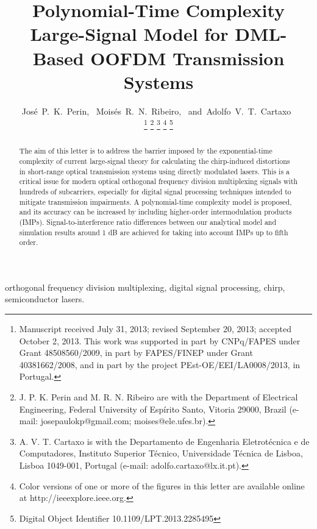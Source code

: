 \documentclass[journal]{IEEEtran}
\makeatletter
\def\markboth#1#2{\def\leftmark{\@IEEEcompsoconly{\sffamily}\MakeUppercase{\protect#1}}%
\def\rightmark{\@IEEEcompsoconly{\sffamily}\MakeUppercase{\protect#2}}}
\makeatother
\begin{document}
 
\title{Polynomial-Time Complexity Large-Signal Model for DML-Based OOFDM Transmission Systems}
\author{José~P.~K.~Perin,~\IEEEmembership{}
        Moisés~R.~N.~Ribeiro,~\IEEEmembership{}
        and~Adolfo~V.~T.~Cartaxo~%

\thanks{Manuscript received July 31, 2013; revised September 20, 2013; accepted October 2, 2013. This work was supported in part by CNPq/FAPES under Grant 48508560/2009, in part by FAPES/FINEP under Grant 40381662/2008, and in part by the project PEst-OE/EEI/LA0008/2013, in Portugal.}
\thanks{J. P. K. Perin and M. R. N. Ribeiro are with the Department of Electrical Engineering, Federal University of Espírito Santo, Vitoria 29000, Brazil (e-mail: josepaulokp@gmail.com; moises@ele.ufes.br).}
\thanks{A. V. T. Cartaxo is with the Departamento de Engenharia Eletrotécnica e de Computadores, Instituto Superior Técnico, Universidade Técnica de Lisboa, Lisboa 1049-001, Portugal (e-mail: adolfo.cartaxo@lx.it.pt).}
\thanks{Color versions of one or more of the figures in this letter are available online at http://ieeexplore.ieee.org.}
\thanks{ Digital Object Identifier 10.1109/LPT.2013.2285495}
}

\markboth{IEEE PHOTONICS TECHNOLOGY LETTERS}{}%
\maketitle
\begin{abstract}
The aim of this letter is to address the barrier imposed by the exponential-time complexity of current large-signal theory for calculating the chirp-induced distortions in short-range optical transmission systems using directly modulated lasers. This is a critical issue for modern optical orthogonal frequency division multiplexing signals with hundreds of subcarriers, especially for digital signal processing techniques intended to mitigate transmission impairments. A polynomial-time complexity model is proposed, and its accuracy can be increased by including higher-order intermodulation products (IMPs). Signal-to-interference ratio differences between our analytical model and simulation results around 1 dB are achieved for taking into account IMPs up to fifth order. 
\end{abstract}
\begin{IEEEkeywords}
orthogonal frequency division multiplexing, digital signal processing, chirp, semiconductor lasers.
\end{IEEEkeywords}
\IEEEpeerreviewmaketitle
\end{document}
